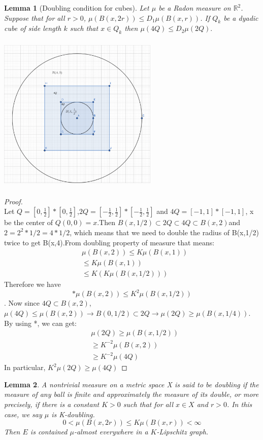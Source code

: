 \documentclass{article}
\newtheorem{lemma}{Lemma}
\begin{document}
\begin{lemma}[Doubling condition for cubes]
Let $\mu$ be a Radon measure on $\mathbb{R}^2$.  Suppose that for all $r>0$, $\mu(B(x, 2r))\le D_1\mu(B(x,r))$.  If $Q_k$ be a dyadic cube of side length $k$ such that $x\in Q_k$ then $\mu(4Q)\le D_2\mu(2Q).$\\
\end{lemma}

\includegraphics[width = 3in, height = 3in]{Screen Shot 2021-06-22 at 10.18.14 AM.png}\\
\begin{proof}\\
Let $Q = [0,\frac{1}{2}]*[0,\frac{1}{2}]$,$2Q = [-\frac{1}{2},\frac{1}{2}]*[-\frac{1}{2},\frac{1}{2}]$ and $4Q = [-1,1]*[-1,1]$, x be the center of $Q(0,0) = x$.Then $B(x, 1/2) \subset 2Q \subset 4Q \subset B(x,2)$and $2 = 2^2 * 1/2 = 4*1/2$, which means that we need to double the radius of B(x,1/2) twice to get B(x,4).From doubling property of measure that means:
\begin{align*}
&\mu(B(x,2)) \leq K\mu(B(x,1))\\
&\leq K\mu(B(x,1))\\
&\leq K(K\mu(B(x,1/2)))
\end{align*}
Therefore we have \[*\mu(B(x,2))\leq K^2\mu(B(x,1/2))\].
Now since $4Q\subset B(x,2)$, $\mu(4Q)\leq \mu(B(x,2))\rightarrow B(0,1/2) \subset 2Q\rightarrow \mu(2Q) \geq \mu(B(x,1/4))$. By using *, we can get:
\begin{align*}
&\mu(2Q) \geq \mu(B(x,1/2))\\
&\geq K^{-2}\mu(B(x,2))\\
&\geq K^{-2}\mu(4Q)
\end{align*}
In particular, $K^2\mu(2Q)\geq\mu(4Q)$
\end{proof}
\begin{lemma}\label{lemma:CBQ2carried}
A nontrivial measure on a metric space X is said to be doubling if the measure of any ball is finite and approximately the measure of its double, or more precisely, if there is a constant $K > 0$ such that for all $x \in X$ and $r > 0$. In this case, we say $\mu$ is K-doubling.
    \begin{equation}\label{muB2=0}
         0<\mu (B(x,2r))\leq K\mu (B(x,r))<\infty
    \end{equation}
    Then $E$ is contained $\mu$-almost everywhere in a $K$-Lipschitz graph.
\end{lemma}
\end{document}
